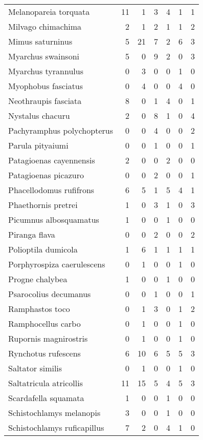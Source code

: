 \begin{table}[ht]
\begin{tabular}{lrrrrrr}
  Melanopareia torquata & 11 & 1 & 3 & 4 & 1 & 1 \\ 
  Milvago chimachima & 2 & 1 & 2 & 1 & 1 & 2 \\ 
  Mimus saturninus & 5 & 21 & 7 & 2 & 6 & 3 \\ 
  Myarchus swainsoni & 5 & 0 & 9 & 2 & 0 & 3 \\ 
  Myarchus tyrannulus & 0 & 3 & 0 & 0 & 1 & 0 \\ 
  Myophobus fasciatus & 0 & 4 & 0 & 0 & 4 & 0 \\ 
  Neothraupis fasciata & 8 & 0 & 1 & 4 & 0 & 1 \\ 
  Nystalus chacuru & 2 & 0 & 8 & 1 & 0 & 4 \\ 
  Pachyramphus polychopterus & 0 & 0 & 4 & 0 & 0 & 2 \\ 
  Parula pityaiumi & 0 & 0 & 1 & 0 & 0 & 1 \\ 
  Patagioenas cayennensis & 2 & 0 & 0 & 2 & 0 & 0 \\ 
  Patagioenas picazuro & 0 & 0 & 2 & 0 & 0 & 1 \\ 
  Phacellodomus rufifrons & 6 & 5 & 1 & 5 & 4 & 1 \\ 
  Phaethornis pretrei & 1 & 0 & 3 & 1 & 0 & 3 \\ 
  Picumnus albosquamatus & 1 & 0 & 0 & 1 & 0 & 0 \\ 
  Piranga flava & 0 & 0 & 2 & 0 & 0 & 2 \\ 
  Polioptila dumicola & 1 & 6 & 1 & 1 & 1 & 1 \\ 
  Porphyrospiza caerulescens & 0 & 1 & 0 & 0 & 1 & 0 \\ 
  Progne chalybea & 1 & 0 & 0 & 1 & 0 & 0 \\ 
  Psarocolius decumanus & 0 & 0 & 1 & 0 & 0 & 1 \\ 
  Ramphastos toco & 0 & 1 & 3 & 0 & 1 & 2 \\ 
  Ramphocellus carbo & 0 & 1 & 0 & 0 & 1 & 0 \\ 
  Rupornis magnirostris & 0 & 1 & 0 & 0 & 1 & 0 \\ 
  Rynchotus rufescens & 6 & 10 & 6 & 5 & 5 & 3 \\ 
  Saltator similis & 0 & 1 & 0 & 0 & 1 & 0 \\ 
  Saltatricula atricollis & 11 & 15 & 5 & 4 & 5 & 3 \\ 
  Scardafella squamata & 1 & 0 & 0 & 1 & 0 & 0 \\ 
  Schistochlamys melanopis & 3 & 0 & 0 & 1 & 0 & 0 \\ 
  Schistochlamys ruficapillus & 7 & 2 & 0 & 4 & 1 & 0 \\ 

\end{tabular}
\end{table}
